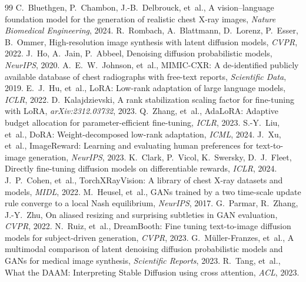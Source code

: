\documentclass[11pt]{article}
\begin{document}
\begin{thebibliography}{99}
\small
{} C.~Bluethgen, P.~Chambon, J.-B.~Delbrouck, et~al., A
vision--language foundation model for the generation of realistic chest X-ray
images, \textit{Nature Biomedical Engineering}, 2024.
 R.~Rombach, A.~Blattmann, D.~Lorenz, P.~Esser, B.~Ommer,
High-resolution image synthesis with latent diffusion models, \textit{CVPR},
2022.
 J.~Ho, A.~Jain, P.~Abbeel, Denoising diffusion probabilistic
models, \textit{NeurIPS}, 2020.
 A.~E.~W.~Johnson, et~al., MIMIC-CXR: A de-identified publicly
available database of chest radiographs with free-text reports,
\textit{Scientific Data}, 2019.
 E.~J.~Hu, et~al., LoRA: Low-rank adaptation of large language
models, \textit{ICLR}, 2022.
 D.~Kalajdzievski, A rank stabilization scaling factor for
fine-tuning with LoRA, \textit{arXiv:2312.03732}, 2023.
 Q.~Zhang, et~al., AdaLoRA: Adaptive budget allocation for
parameter-efficient fine-tuning, \textit{ICLR}, 2023.
 S.-Y.~Liu, et~al., DoRA: Weight-decomposed low-rank adaptation,
\textit{ICML}, 2024.
 J.~Xu, et~al., ImageReward: Learning and evaluating human
preferences for text-to-image generation, \textit{NeurIPS}, 2023.
 K.~Clark, P.~Vicol, K.~Swersky, D.~J.~Fleet, Directly
fine-tuning diffusion models on differentiable rewards, \textit{ICLR}, 2024.
 J.~P.~Cohen, et~al., TorchXRayVision: A library of chest X-ray
datasets and models, \textit{MIDL}, 2022.
 M.~Heusel, et~al., GANs trained by a two time-scale update rule
converge to a local Nash equilibrium, \textit{NeurIPS}, 2017.
 G.~Parmar, R.~Zhang, J.-Y.~Zhu, On aliased resizing and
surprising subtleties in GAN evaluation, \textit{CVPR}, 2022.
 N.~Ruiz, et~al., DreamBooth: Fine tuning text-to-image
diffusion models for subject-driven generation, \textit{CVPR}, 2023.
 G.~Müller-Franzes, et~al., A multimodal comparison of latent
denoising diffusion probabilistic models and GANs for medical image synthesis,
\textit{Scientific Reports}, 2023.
 R.~Tang, et~al., What the DAAM: Interpreting Stable Diffusion
using cross attention, \textit{ACL}, 2023.
\end{thebibliography}
\end{document}
